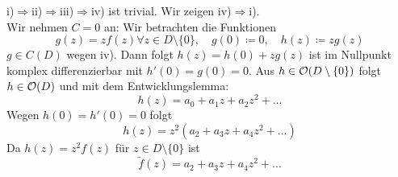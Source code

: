 \begin{beweis}
	i)$ \Rightarrow $ii)$ \Rightarrow $iii)$ \Rightarrow $iv) ist trivial. Wir zeigen iv)$ \Rightarrow $i).\\
	Wir nehmen $ C=0 $ an: Wir betrachten die Funktionen
	\[ g(z)=zf(z)\forall z\in D\setminus\lbrace 0\rbrace,\quad g(0)\coloneqq 0,\quad h(z)\coloneqq zg(z) \]
	$ g\in C(D) $ wegen iv). Dann folgt $ h(z)=h(0)+zg(z) $ ist im Nullpunkt komplex differenzierbar mit $ h'(0)=g(0)=0 $. Aus $ h\in\mathcal O(D\setminus\lbrace 0\rbrace) $ folgt $ h\in\mathcal O(D) $ und mit dem Entwicklungslemma:
	\[ h(z)=a_0+a_1z+a_2z^2+... \]
	Wegen $ h(0)=h'(0)=0 $ folgt
	\[ h(z)=z^2(a_2+a_3z+a_4z^2+...) \]
	Da $ h(z)=z^2f(z) $ f\"ur $ z\in D\setminus\lbrace 0\rbrace $ ist
	\[ \tilde f(z)=a_2+a_3z+a_4z^2+... \]
\end{beweis}